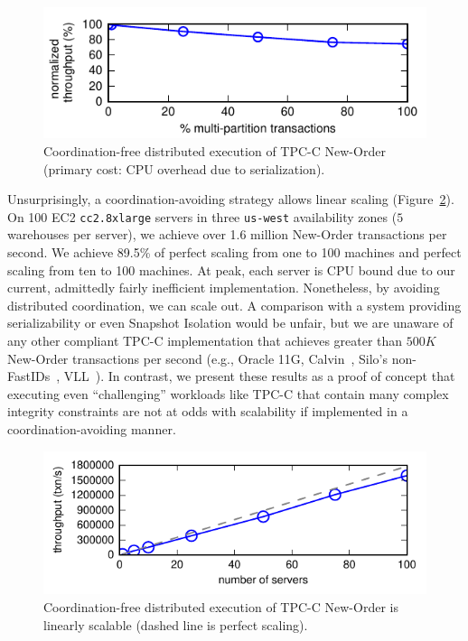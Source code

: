 \begin{figure}
\includegraphics[width=\columnwidth]{figs/pct_thru.pdf}\vspace{-1em}
\caption{Coordination-free distributed execution of TPC-C New-Order
  (primary cost: CPU overhead due to serialization).}
\label{fig:pct}
\end{figure}

Unsurprisingly, a coordination-avoiding strategy allows linear scaling
(Figure~\ref{fig:scaleout}). On 100 EC2 \texttt{cc2.8xlarge} servers
in three \texttt{us-west} availability zones ($5$ warehouses per
server), we achieve over 1.6 million New-Order transactions per
second. We achieve 89.5\% of perfect scaling from one to 100 machines
and perfect scaling from ten to 100 machines. At peak, each server is
CPU bound due to our current, admittedly fairly inefficient
implementation. Nonetheless, by avoiding distributed coordination, we
can scale out. A comparison with a system providing serializability or
even Snapshot Isolation would be unfair, but we are unaware of any
other compliant TPC-C implementation that achieves greater than $500K$
New-Order transactions per second (e.g., Oracle 11G,
Calvin~\cite{calvin}, Silo's non-FastIDs~\cite{silo},
VLL~\cite{abadi-vll}). In contrast, we present these results as a
proof of concept that executing even ``challenging'' workloads like
TPC-C that contain many complex integrity constraints are not at odds
with scalability if implemented in a coordination-avoiding manner.

\begin{figure}
\begin{center}
\includegraphics[width=\columnwidth]{figs/thru_scale.pdf}\vspace{-2em}
\end{center}
\caption{Coordination-free distributed execution of TPC-C New-Order is
  linearly scalable (dashed line is perfect scaling).}
\label{fig:scaleout}
\end{figure}

